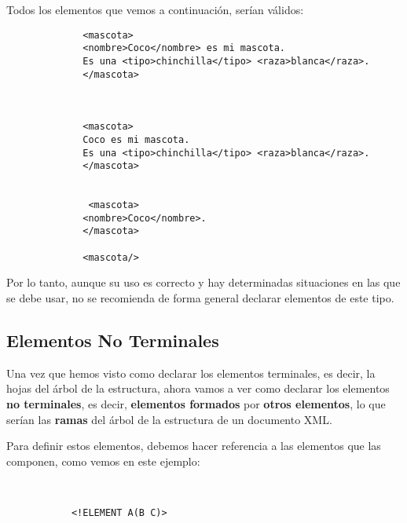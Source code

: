 \begin{itemize}
    Todos los elementos que vemos a continuación, serían válidos:


        \begin{figure}[H]
        \begin{tcolorbox}[sharp corners, colback=yellow!30, colframe=white!20]
            \scriptsize
            \begin{verbatim}
        <mascota>
        <nombre>Coco</nombre> es mi mascota.
        Es una <tipo>chinchilla</tipo> <raza>blanca</raza>.
        </mascota>



        <mascota>
        Coco es mi mascota.
        Es una <tipo>chinchilla</tipo> <raza>blanca</raza>.
        </mascota>


         <mascota>
        <nombre>Coco</nombre>.
        </mascota>

        <mascota/>
            \end{verbatim}
        \end{tcolorbox}
    \end{figure}

    Por lo tanto, aunque su uso es correcto y hay determinadas situaciones en las que se debe usar, no se recomienda de forma general declarar elementos de este tipo.
\end{itemize}

\subsection{Elementos No Terminales}
Una vez que hemos visto como declarar los elementos terminales, es decir, la hojas del árbol de la estructura, ahora vamos a ver como declarar los elementos \textbf{no terminales}, es decir, \textbf{elementos formados} por \textbf{otros elementos}, lo que serían las \textbf{ramas} del árbol de la estructura de un documento XML.

Para definir estos elementos, debemos hacer referencia a las elementos que las componen, como vemos en este ejemplo:

\begin{figure}[H]
    \begin{tcolorbox}[sharp corners, colback=yellow!30, colframe=white!20]
        \scriptsize
        \begin{verbatim}


      <!ELEMENT A(B C)>
        \end{verbatim}
    \end{tcolorbox}
\end{figure}

